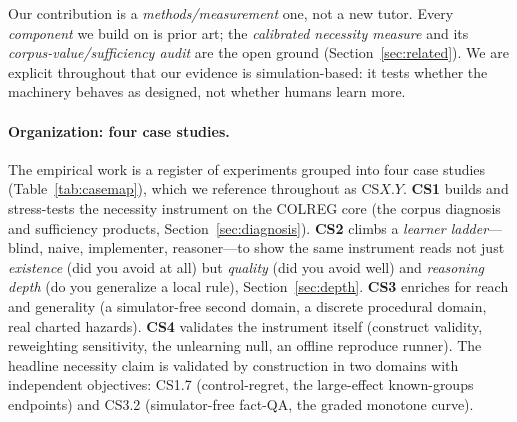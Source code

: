 \documentclass{article}
\begin{document}
Our contribution is a \emph{methods/measurement} one, not a new tutor. Every \emph{component} we
build on is prior art; the \emph{calibrated necessity measure} and its \emph{corpus-value/sufficiency
audit} are the open ground (Section~\ref{sec:related}). We are explicit throughout that our
evidence is simulation-based: it tests whether the machinery behaves as designed, not whether
humans learn more.

\paragraph{Organization: four case studies.} The empirical work is a register of experiments grouped
into four case studies (Table~\ref{tab:casemap}), which we reference throughout as CS$X.Y$.
\textbf{CS1} builds and stress-tests the necessity instrument on the COLREG core (the corpus
diagnosis and sufficiency products, Section~\ref{sec:diagnosis}). \textbf{CS2} climbs a
\emph{learner ladder}---blind, naive, implementer, reasoner---to show the same instrument reads not
just \emph{existence} (did you avoid at all) but \emph{quality} (did you avoid well) and
\emph{reasoning depth} (do you generalize a local rule), Section~\ref{sec:depth}. \textbf{CS3}
enriches for reach and generality (a simulator-free second domain, a discrete procedural domain, real
charted hazards). \textbf{CS4} validates the instrument itself (construct validity, reweighting
sensitivity, the unlearning null, an offline reproduce runner). The headline necessity claim is
validated by construction in two domains with independent objectives: CS1.7 (control-regret, the
large-effect known-groups endpoints) and CS3.2 (simulator-free fact-QA, the graded monotone curve).
\end{document}
